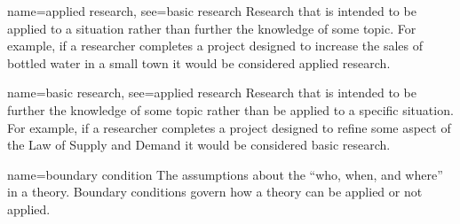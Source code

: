






{name={applied research},
 see={basic research}}
{%
	Research that is intended to be applied to a situation rather than further the knowledge of some topic. For example, if a researcher completes a project designed to increase the sales of bottled water in a small town it would be considered applied research.
}

{name={basic research},
	see={applied research}}
{%
	Research that is intended to be further the knowledge of some topic rather than be applied to a specific situation. For example, if a researcher completes a project designed to refine some aspect of the Law of Supply and Demand it would be considered basic research.  
}

{name={boundary condition}}
{%
	The assumptions about the ``who, when, and where'' in a theory. Boundary conditions govern how a theory can be applied or not applied.
}

